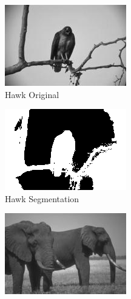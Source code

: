 \documentclass[11pt]{article}
\begin{document}
 
\begin{figure}
\centering
\graphicspath{{../code/}}
\begin{subfigure}[b]{0.4\textwidth}
\centering
\includegraphics[width=\textwidth]{hawk_sm}
\caption{Hawk Original}
\label{fig:ev1:r10}
\end{subfigure}
\begin{subfigure}[b]{0.4\textwidth}
\centering
\includegraphics[width=\textwidth]{hawk_10_seg}
\caption{Hawk Segmentation}
\label{fig:ev2:r10}
\end{subfigure}
\begin{subfigure}[b]{0.4\textwidth}
\centering
\includegraphics[width=\textwidth]{elephants_sm}

\end{subfigure}
\end{figure}
\end{document}

